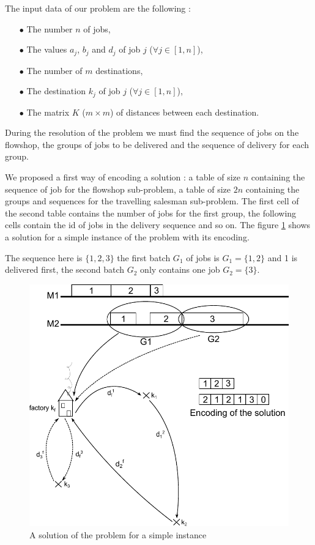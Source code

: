 \documentclass[UTF8, twoside]{EPURapport}
\begin{document}
	The input data of our problem are the following :
\begin{itemize}
\item[$\bullet$] The number $n$ of jobs,
\item[$\bullet$] The values $a_j$, $b_j$ and $d_j$ of job $j$ ($\forall j \in [1,n]$),
\item[$\bullet$] The number of $m$ destinations,
\item[$\bullet$] The destination $k_j$ of job $j$ ($\forall j \in [1,n]$),
\item[$\bullet$] The matrix $K$ ($m \times m$) of distances between each destination.\\
\end{itemize}

	During the resolution of the problem we must find the sequence of jobs on the flowshop, the groups of jobs to be delivered and the sequence of delivery for each group.

	We proposed a first way of encoding a solution : a table of size $n$ containing the sequence of job for the flowshop sub-problem, a table of size $2n$ containing the groups and sequences for the travelling salesman sub-problem. The first cell of the second table contains the number of jobs for the first group, the following cells contain the id of jobs in the delivery sequence and so on. The figure \ref{problem} shows a solution for a simple instance of the problem with its encoding. 
	
	The sequence here is $\{1,2,3\}$ the first batch $G_1$ of jobs is $G_1 = \{1,2\}$ and 1 is delivered first, the second batch $G_2$ only contains one job $G_2 = \{3\}$.
	
	
\begin{figure}
	\centering \includegraphics{images/problem.pdf}
	\caption {A solution of the problem for a simple instance}	
	\label {problem}
\end{figure}
\end{document}
